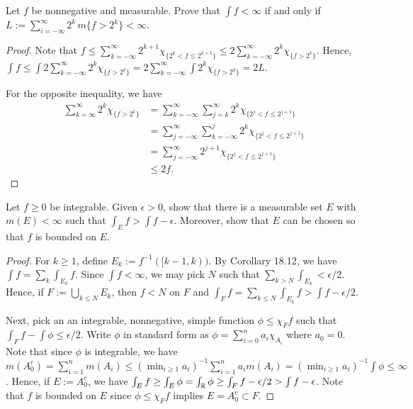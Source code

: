 \documentclass{article}
\newcommand{\m}{\,m}
\begin{document}
 Let $f$ be nonnegative and measurable. Prove that $\int f < \infty$ if and only if $L := \sum_{i=-\infty}^\infty 2^k \m\{ f > 2^k \} < \infty$.
\begin{proof}

Note that $f \le \sum_{k=-\infty}^\infty 2^{k+1} \chi_{\{2^k < f \le 2^{k+1} \}} \le 2 \sum_{k=-\infty}^\infty 2^{k} \chi_{\{f >2^k \}}$. Hence, $\int f \le \int 2 \sum_{k=-\infty}^\infty 2^{k} \chi_{\{f >2^k \}} = 2 \sum_{k=-\infty}^\infty \int 2^{k} \chi_{\{f >2^k \}} = 2 L$.

For the opposite inequality, we have 
\begin{align*}
\sum_{k=\infty}^\infty 2^{k} \chi_{\{f >2^k \}} & = \sum_{k=-\infty}^\infty \sum_{j=k}^{\infty} 2^k \chi_{\{ 2^j < f \le 2^{j+1}\}}
\\ & = \sum_{j=-\infty}^\infty \sum_{k=-\infty}^{j} 2^k \chi_{\{ 2^j < f \le 2^{j+1}\}} 
\\ & = \sum_{j=-\infty}^\infty 2^{j+1} \chi_{\{ 2^j < f \le 2^{j+1}\}} 
\\ & \le 2f.
\end{align*}

\end{proof}


 Let $f \ge 0$ be integrable. Given $\epsilon >0$, show that there is a measurable set $E$ with $m(E) < \infty$ such that $\int_E f > \int f - \epsilon$. Moreover, show that $E$ can be chosen so that $f$ is bounded on $E$.
\begin{proof}
For $k \ge 1$, define $E_k := f^{-1}([k-1, k))$.  By Corollary 18.12, we have $\int f = \sum_k \int_{E_k} f$. Since $\int f < \infty$, we may pick $N$ such that 
$\sum_{k>N} \int_{E_k} < \epsilon/2$.  Hence, if $F:= \bigcup_{k\le N} E_k$, then $f < N$ on $F$ and $\int_F f =  \sum_{k\le N} \int_{E_k} f > \int f - \epsilon/2$.

Next, pick an an integrable, nonnegative, simple function $\phi \le \chi_F f$ such that $\int_F f - \int \phi \le \epsilon/2$. 
 Write $\phi$ in standard form as $\phi = \sum_{i=0}^n a_i \chi_{A_i}$ where $a_0 = 0$.  Note that since $\phi$ is integrable, we have $m(A_0^c) = \sum_{i=1}^n m(A_i) \le (\min_{i\ge 1} a_i)^{-1} \sum_{i=1}^n a_i m(A_i) = (\min_{i\ge 1} a_i)^{-1} \int \phi \le \infty$. Hence, if $E := A_0^c$, we have $\int_{E} f \ge \int_{E} \phi  = \int_{\mathbb{R}} \phi \ge \int_F f - \epsilon/2 > \int f - \epsilon$. Note that $f$ is bounded on $E$ since $\phi \le \chi_F f$ implies $E = A_0^c \subset F$.

\end{proof}
\end{document}
